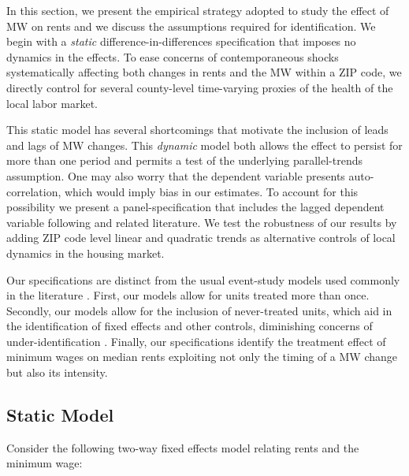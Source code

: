 
In this section, we present the empirical strategy adopted to study the effect of MW 
on rents and we discuss the assumptions required for identification. We begin with a 
\textit{static} difference-in-differences specification that imposes no dynamics in 
the effects. To ease concerns of contemporaneous shocks systematically affecting both 
changes in rents and the MW within a ZIP code, we directly control for several 
county-level time-varying proxies of the health of the local labor market.

This static model has several shortcomings that motivate the inclusion of leads and 
lags of MW changes. This \textit{dynamic} model both allows the effect to persist for 
more than one period and permits a test of the underlying parallel-trends assumption. 
One may also worry that the dependent variable presents auto-correlation, which would 
imply bias in our estimates. To account for this possibility we present a 
panel-specification that includes the lagged dependent variable following 
\textcite{ArellanoBond1991} and related literature. We test the robustness of our 
results by adding ZIP code level linear and quadratic trends as alternative controls 
of local dynamics in the housing market. 

Our specifications are distinct from the usual event-study models used commonly 
in the literature \parencite[discussed in, e.g.,][]{BorusyakJaravel2017, abraham2018}. 
First, our models allow for units treated more than once. Secondly, our models allow 
for the inclusion of never-treated units, which aid in the identification of fixed 
effects and other controls, diminishing concerns of under-identification 
\parencite{BorusyakJaravel2017}. Finally, our specifications identify the treatment 
effect of minimum wages on median rents exploiting not only the timing of a MW change 
but also its intensity.
    
\subsection{Static Model}
Consider the following two-way fixed effects model relating rents and the minimum wage:

